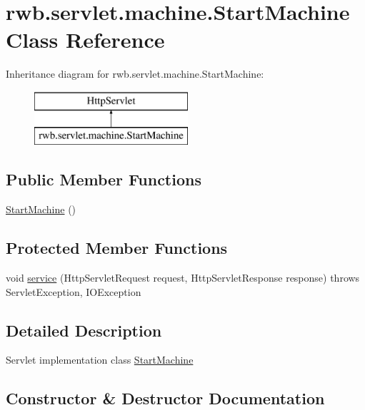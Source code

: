 \hypertarget{classrwb_1_1servlet_1_1machine_1_1_start_machine}{}\section{rwb.\+servlet.\+machine.\+Start\+Machine Class Reference}
\label{classrwb_1_1servlet_1_1machine_1_1_start_machine}
Inheritance diagram for rwb.\+servlet.\+machine.\+Start\+Machine\+:\begin{figure}[H]
\begin{center}
\leavevmode
\includegraphics[height=2.000000cm]{classrwb_1_1servlet_1_1machine_1_1_start_machine}
\end{center}
\end{figure}
\subsection*{Public Member Functions}
\begin{DoxyCompactItemize}
\item 
\hyperlink{classrwb_1_1servlet_1_1machine_1_1_start_machine_aefd715c8cfb29a7083d9304079811190}{Start\+Machine} ()
\end{DoxyCompactItemize}
\subsection*{Protected Member Functions}
\begin{DoxyCompactItemize}
\item 
void \hyperlink{classrwb_1_1servlet_1_1machine_1_1_start_machine_a7ba18a7b31c09a940d6d2fd24b3fd711}{service} (Http\+Servlet\+Request request, Http\+Servlet\+Response response)  throws Servlet\+Exception, I\+O\+Exception 
\end{DoxyCompactItemize}


\subsection{Detailed Description}
Servlet implementation class \hyperlink{classrwb_1_1servlet_1_1machine_1_1_start_machine}{Start\+Machine} 

\subsection{Constructor \& Destructor Documentation}
\mbox{\label{classrwb_1_1servlet_1_1machine_1_1_start_machine_aefd715c8cfb29a7083d9304079811190}} 
